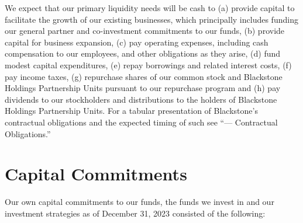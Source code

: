 We expect that our primary liquidity needs will be cash to (a) provide capital to facilitate the growth of our existing businesses, which principally includes funding our general partner and co-investment commitments to our funds, (b) provide capital for business expansion, (c) pay operating expenses, including cash compensation to our employees, and other obligations as they arise, (d) fund modest capital expenditures, (e) repay borrowings and related interest costs, (f) pay income taxes, (g) repurchase shares of our common stock and Blackstone Holdings Partnership Units pursuant to our repurchase program and (h) pay dividends to our stockholders and distributions to the holders of Blackstone Holdings Partnership Units. For a tabular presentation of Blackstone's contractual obligations and the expected timing of such see “— Contractual Obligations.”

\section{Capital Commitments}

Our own capital commitments to our funds, the funds we invest in and our investment strategies as of December 31, 2023 consisted of the following:

